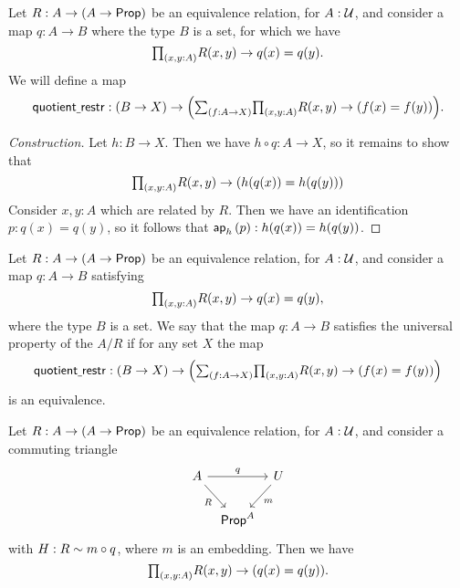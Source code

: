 \begin{defn}
Let $R:A\to (A\to \mathsf{Prop})$ be an equivalence relation, for $A:\mathcal{U}$, and consider a map $q:A\to B$ where the type $B$ is a set, for which we have
\begin{equation*}
\prd{x,y:A}R(x,y)\to q(x)=q(y).
\end{equation*}
We will define a map
\begin{equation*}
\quotientrestr:(B\to X) \to \Big(\sm{f:A\to X}\prd{x,y:A}R(x,y)\to (f(x)=f(y))\Big).
\end{equation*}
\end{defn}

\begin{proof}[Construction]
Let $h:B\to X$. Then we have $h\circ q : A\to X$, so it remains to show that
\begin{equation*}
\prd{x,y:A}R(x,y)\to (h(q(x))=h(q(y)))
\end{equation*}
Consider $x,y:A$ which are related by $R$. Then we have an identification $p:q(x)=q(y)$, so it follows that $\mathsf{ap}_{h}\left({p}\right):h(q(x))=h(q(y))$.  
\end{proof}

\begin{defn}
Let $R:A\to (A\to \mathsf{Prop})$ be an equivalence relation, for $A:\mathcal{U}$, and consider a map $q:A\to B$ satisfying
\begin{equation*}
\prd{x,y:A}R(x,y)\to q(x)=q(y),
\end{equation*}
where the type $B$ is a set. We say that the map $q:A\to B$ satisfies the universal property of the  $A/R$ if for any set $X$ the map
\begin{equation*}
\quotientrestr : (B\to X) \to \Big(\sm{f:A\to X}\prd{x,y:A}R(x,y)\to (f(x)=f(y))\Big)
\end{equation*}
is an equivalence.
\end{defn}

\begin{lem}
Let $R:A\to (A\to \mathsf{Prop})$ be an equivalence relation, for $A:\mathcal{U}$, and consider a commuting triangle
\begin{equation*}
\begin{tikzcd}[column sep=tiny]
A \arrow[rr,"q"] \arrow[dr,swap,"R"] & & U \arrow[dl,"m"] \\
& \prop^A
\end{tikzcd}
\end{equation*}
with $H:R\sim m\circ q$, where $m$ is an embedding. Then we have
\begin{equation*}
\prd{x,y:A}R(x,y)\to (q(x)=q(y)).
\end{equation*}
\end{lem}

